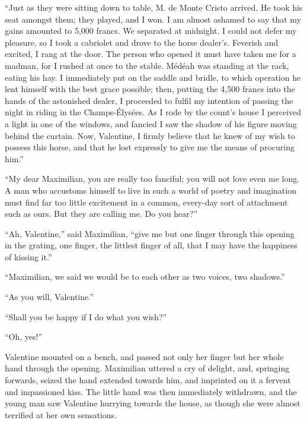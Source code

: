 “Just as they were sitting down to table, M. de Monte Cristo arrived.
He took his seat amongst them; they played, and I won. I am almost
ashamed to say that my gains amounted to 5,000 francs. We separated at
midnight. I could not defer my pleasure, so I took a cabriolet and
drove to the horse dealer’s. Feverish and excited, I rang at the door.
The person who opened it must have taken me for a madman, for I rushed
at once to the stable. Médéah was standing at the rack, eating his hay.
I immediately put on the saddle and bridle, to which operation he lent
himself with the best grace possible; then, putting the 4,500 francs
into the hands of the astonished dealer, I proceeded to fulfil my
intention of passing the night in riding in the Champs-Élysées. As I
rode by the count’s house I perceived a light in one of the windows,
and fancied I saw the shadow of his figure moving behind the curtain.
Now, Valentine, I firmly believe that he knew of my wish to possess
this horse, and that he lost expressly to give me the means of
procuring him.”

“My dear Maximilian, you are really too fanciful; you will not love
even me long. A man who accustoms himself to live in such a world of
poetry and imagination must find far too little excitement in a common,
every-day sort of attachment such as ours. But they are calling me. Do
you hear?”

“Ah, Valentine,” said Maximilian, “give me but one finger through this
opening in the grating, one finger, the littlest finger of all, that I
may have the happiness of kissing it.”

“Maximilian, we said we would be to each other as two voices, two
shadows.”

“As you will, Valentine.”

“Shall you be happy if I do what you wish?”

“Oh, yes!”

Valentine mounted on a bench, and passed not only her finger but her
whole hand through the opening. Maximilian uttered a cry of delight,
and, springing forwards, seized the hand extended towards him, and
imprinted on it a fervent and impassioned kiss. The little hand was
then immediately withdrawn, and the young man saw Valentine hurrying
towards the house, as though she were almost terrified at her own
sensations.
